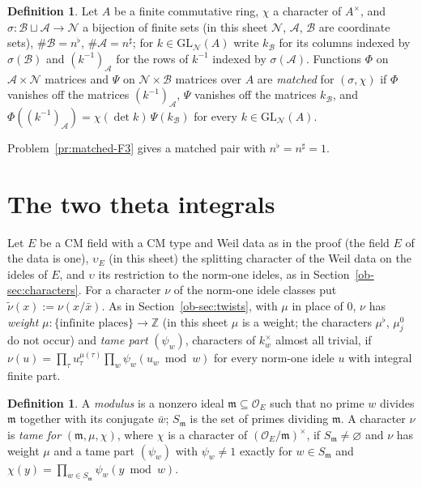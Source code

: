 \documentclass[reqno]{amsart}
\theoremstyle{definition}
\newtheorem{definition}[problem]{Definition}
\theoremstyle{plain}
\newcommand{\Z}{\mathbb Z}
\newcommand{\Oc}{\mathcal O}
\newcommand{\GL}{\mathrm{GL}}
\newcommand{\ns}{n^\sharp}
\newcommand{\nb}{n^\flat}
\begin{document}
\begin{definition}\label{def:matched}
Let \(A\) be a finite commutative ring, \(\chi\) a character of \(A^\times\), and \(\sigma \colon \mathcal B \sqcup \mathcal A \to \mathcal N\) a bijection of finite sets (in this sheet \(\mathcal N\), \(\mathcal A\), \(\mathcal B\) are coordinate sets), \(\#\mathcal B = \nb\), \(\#\mathcal A = \ns\); for \(k \in \GL_{\mathcal N}(A)\) write \(k_{\mathcal B}\) for its columns indexed by \(\sigma(\mathcal B)\) and \((k^{-1})_{\mathcal A}\) for the rows of \(k^{-1}\) indexed by \(\sigma(\mathcal A)\).  Functions \(\Phi\) on \(\mathcal A \times \mathcal N\) matrices and \(\Psi\) on \(\mathcal N \times \mathcal B\) matrices over \(A\) are \emph{matched} for \((\sigma, \chi)\) if \(\Phi\) vanishes off the matrices \((k^{-1})_{\mathcal A}\), \(\Psi\) vanishes off the matrices \(k_{\mathcal B}\), and \(\Phi((k^{-1})_{\mathcal A}) = \chi(\det k)\, \Psi(k_{\mathcal B})\) for every \(k \in \GL_{\mathcal N}(A)\).
\end{definition}

Problem~\ref{pr:matched-F3} gives a matched pair with \(\nb = \ns = 1\).

\section{The two theta integrals}\label{sec:integrals}

Let \(E\) be a CM field with a CM type and Weil data as in the proof (the field \(E\) of the data is one), \(\upsilon_E\) (in this sheet) the splitting character of the Weil data on the ideles of \(E\), and \(\upsilon\) its restriction to the norm-one ideles, as in Section~\ref{ob-sec:characters}.  For a character \(\nu\) of the norm-one idele classes put \(\tilde\nu(x) := \nu(x/\bar x)\).  As in Section~\ref{ob-sec:twists}, with \(\mu\) in place of \(0\), \(\nu\) has \emph{weight} \(\mu\colon \{\text{infinite places}\} \to \Z\) (in this sheet \(\mu\) is a weight; the characters \(\mu^\flat\), \(\mu_j^0\) do not occur) and \emph{tame part} \((\psi_w)\), characters of \(k_w^\times\) almost all trivial, if \(\nu(u) = \prod_\tau u_\tau^{\mu(\tau)}\prod_w \psi_w(u_w \bmod w)\) for every norm-one idele \(u\) with integral finite part.

\begin{definition}\label{def:modulus}
A \emph{modulus} is a nonzero ideal \(\mathfrak m \subseteq \Oc_E\) such that no prime \(w\) divides \(\mathfrak m\) together with its conjugate \(\bar w\); \(S_{\mathfrak m}\) is the set of primes dividing \(\mathfrak m\).  A character \(\nu\) is \emph{tame for} \((\mathfrak m, \mu, \chi)\), where \(\chi\) is a character of \((\Oc_E/\mathfrak m)^\times\), if \(S_{\mathfrak m} \ne \varnothing\) and \(\nu\) has weight \(\mu\) and a tame part \((\psi_w)\) with \(\psi_w \ne 1\) exactly for \(w \in S_{\mathfrak m}\) and \(\chi(y) = \prod_{w \in S_{\mathfrak m}}\psi_w(y \bmod w)\).
\end{definition}
\end{document}
